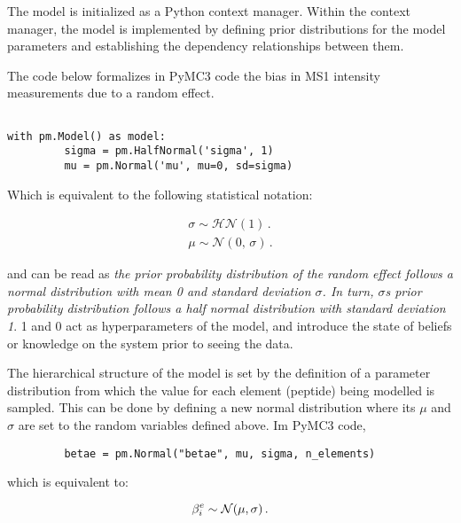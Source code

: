 The model is initialized as a Python context manager. Within the context manager, the model is implemented by defining prior distributions for the model parameters and establishing the dependency relationships between them.

The code below formalizes in PyMC3 code the bias in \ac{MS1} intensity measurements due to a random effect.

\begin{verbatim}

with pm.Model() as model:             
         sigma = pm.HalfNormal('sigma', 1)
         mu = pm.Normal('mu', mu=0, sd=sigma)
\end{verbatim}


Which is equivalent to the following statistical notation:

\begin{align}
\sigma \sim \mathcal{HN}(1)\,.  \\
\mu \sim \mathcal{N}(0,\,\sigma)\,.
\end{align}

and can be read as \textit{the prior probability distribution of the random effect follows a normal distribution with mean 0 and standard deviation $\sigma$. In turn, $\sigma$\textquotesingle s prior probability distribution follows a half normal distribution with standard deviation 1}. 1 and 0 act as hyperparameters of the model, and introduce the state of beliefs or knowledge on the system prior to seeing the data.


The hierarchical structure of the model is set by the definition of a parameter distribution from which the value for each element (peptide) being modelled is sampled. This can be done by defining a new normal distribution where its $\mu$ and $\sigma$ are set to the random variables defined above. Im PyMC3 code,

\begin{verbatim}
         betae = pm.Normal("betae", mu, sigma, n_elements)  
\end{verbatim}

which is equivalent to:

\begin{equation}
\beta^e_i \sim \mathcal{N}(\mu, \sigma)\,.  \\
\end{equation}

